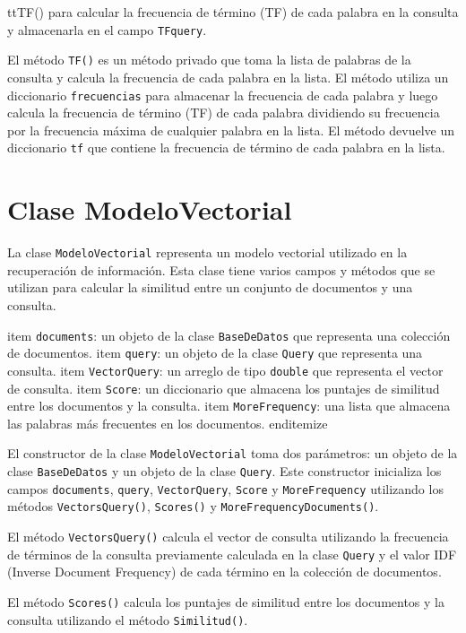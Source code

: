 \documentclass{article}
\begin{document}
tt{TF()} para calcular la frecuencia de término (TF) de cada palabra en la consulta y almacenarla en el campo \texttt{TFquery}.

El método \texttt{TF()} es un método privado que toma la lista de palabras de la consulta y calcula la frecuencia de cada palabra en la lista. El método utiliza un diccionario \texttt{frecuencias} para almacenar la frecuencia de cada palabra y luego calcula la frecuencia de término (TF) de cada palabra dividiendo su frecuencia por la frecuencia máxima de cualquier palabra en la lista. El método devuelve un diccionario \texttt{tf} que contiene la frecuencia de término de cada palabra en la lista.

\section{ {\Huge Clase ModeloVectorial}}

La clase \texttt{ModeloVectorial} representa un modelo vectorial utilizado en la recuperación de información. Esta clase tiene varios campos y métodos que se utilizan para calcular la similitud entre un conjunto de documentos y una consulta.

item \texttt{documents}: un objeto de la clase \texttt{BaseDeDatos} que representa una colección de documentos.
item \texttt{query}: un objeto de la clase \texttt{Query} que representa una consulta.
item \texttt{VectorQuery}: un arreglo de tipo \texttt{double} que representa el vector de consulta.
item \texttt{Score}: un diccionario que almacena los puntajes de similitud entre los documentos y la consulta.
item \texttt{MoreFrequency}: una lista que almacena las palabras más frecuentes en los documentos.
end{itemize}

El constructor de la clase \texttt{ModeloVectorial} toma dos parámetros: un objeto de la clase \texttt{BaseDeDatos} y un objeto de la clase \texttt{Query}. Este constructor inicializa los campos \texttt{documents}, \texttt{query}, \texttt{VectorQuery}, \texttt{Score} y \texttt{MoreFrequency} utilizando los métodos \texttt{VectorsQuery()}, \texttt{Scores()} y \texttt{MoreFrequencyDocuments()}.

El método \texttt{VectorsQuery()} calcula el vector de consulta utilizando la frecuencia de términos de la consulta previamente calculada en la clase \texttt{Query} y el valor IDF (Inverse Document Frequency) de cada término en la colección de documentos.

El método \texttt{Scores()} calcula los puntajes de similitud entre los documentos y la consulta utilizando el método \texttt{Similitud()}.
\end{document}
